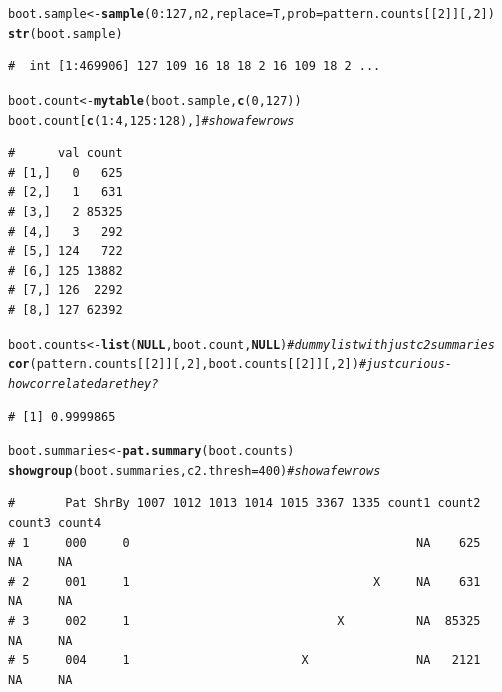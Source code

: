 \documentclass{article}\usepackage[]{graphicx}\usepackage[]{color}
\makeatletter
\newcommand{\hlnum}[1]{\textcolor[rgb]{0.686,0.059,0.569}{#1}}%
\newcommand{\hlcom}[1]{\textcolor[rgb]{0.678,0.584,0.686}{\textit{#1}}}%
\newcommand{\hlopt}[1]{\textcolor[rgb]{0,0,0}{#1}}%
\newcommand{\hlstd}[1]{\textcolor[rgb]{0.345,0.345,0.345}{#1}}%
\newcommand{\hlkwa}[1]{\textcolor[rgb]{0.161,0.373,0.58}{\textbf{#1}}}%
\newcommand{\hlkwb}[1]{\textcolor[rgb]{0.69,0.353,0.396}{#1}}%
\newcommand{\hlkwc}[1]{\textcolor[rgb]{0.333,0.667,0.333}{#1}}%
\newcommand{\hlkwd}[1]{\textcolor[rgb]{0.737,0.353,0.396}{\textbf{#1}}}%
\newenvironment{kframe}{%
 \def\at@end@of@kframe{}%
 \ifinner\ifhmode%
  \def\at@end@of@kframe{\end{minipage}}%
  \begin{minipage}{\columnwidth}%
 \fi\fi%
 \def\FrameCommand##1{\hskip\@totalleftmargin \hskip-\fboxsep
 \colorbox{shadecolor}{##1}\hskip-\fboxsep
     \hskip-\linewidth \hskip-\@totalleftmargin \hskip\columnwidth}%
 \MakeFramed {\advance\hsize-\width
   \@totalleftmargin\z@ \linewidth\hsize
   \@setminipage}}%
 {\par\unskip\endMakeFramed%
 \at@end@of@kframe}
\newenvironment{knitrout}{}{} %
\makeatother
\begin{document}
\begin{knitrout}\footnotesize
{}\color{fgcolor}\begin{kframe}
\begin{alltt}
\hlstd{boot.sample} \hlkwb{<-} \hlkwd{sample}\hlstd{(}\hlnum{0}\hlopt{:}\hlnum{127}\hlstd{,n2,}\hlkwc{replace}\hlstd{=T,}\hlkwc{prob}\hlstd{=pattern.counts[[}\hlnum{2}\hlstd{]][,}\hlnum{2}\hlstd{])}
\hlkwd{str}\hlstd{(boot.sample)}
\end{alltt}
\begin{verbatim}
#  int [1:469906] 127 109 16 18 18 2 16 109 18 2 ...
\end{verbatim}
\begin{alltt}
\hlstd{boot.count} \hlkwb{<-} \hlkwd{mytable}\hlstd{(boot.sample,}\hlkwd{c}\hlstd{(}\hlnum{0}\hlstd{,}\hlnum{127}\hlstd{))}
\hlstd{boot.count[}\hlkwd{c}\hlstd{(}\hlnum{1}\hlopt{:}\hlnum{4}\hlstd{,}\hlnum{125}\hlopt{:}\hlnum{128}\hlstd{),]} \hlcom{# show a few rows}
\end{alltt}
\begin{verbatim}
#      val count
# [1,]   0   625
# [2,]   1   631
# [3,]   2 85325
# [4,]   3   292
# [5,] 124   722
# [6,] 125 13882
# [7,] 126  2292
# [8,] 127 62392
\end{verbatim}
\begin{alltt}
\hlstd{boot.counts} \hlkwb{<-} \hlkwd{list}\hlstd{(}\hlkwa{NULL}\hlstd{,boot.count,}\hlkwa{NULL}\hlstd{)} \hlcom{# dummy list with just c2 summaries}
\hlkwd{cor}\hlstd{(pattern.counts[[}\hlnum{2}\hlstd{]][,}\hlnum{2}\hlstd{],boot.counts[[}\hlnum{2}\hlstd{]][,}\hlnum{2}\hlstd{])} \hlcom{# just curious - how correlated are they?}
\end{alltt}
\begin{verbatim}
# [1] 0.9999865
\end{verbatim}
\begin{alltt}
\hlstd{boot.summaries} \hlkwb{<-} \hlkwd{pat.summary}\hlstd{(boot.counts)}
\hlkwd{showgroup}\hlstd{(boot.summaries,}\hlkwc{c2.thresh}\hlstd{=}\hlnum{400}\hlstd{)} \hlcom{#show a few rows}
\end{alltt}
\begin{verbatim}
#       Pat ShrBy 1007 1012 1013 1014 1015 3367 1335 count1 count2 count3 count4
# 1     000     0                                        NA    625     NA     NA
# 2     001     1                                  X     NA    631     NA     NA
# 3     002     1                             X          NA  85325     NA     NA
# 5     004     1                        X               NA   2121     NA     NA

\end{verbatim}
\end{kframe}
\end{knitrout}
\end{document}
